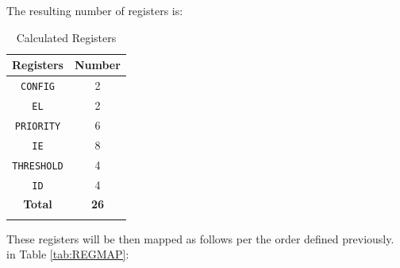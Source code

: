 The resulting number of registers is:

\begin{longtable}[c]{@{}cc@{}}	
		\toprule 
		\textbf{Registers} & \textbf{Number}\\
		\midrule 
		\endhead
		\texttt{CONFIG}    & 2\\
		\texttt{EL}        & 2\\
		\texttt{PRIORITY}  & 6\\
		\texttt{IE}        & 8\\
		\texttt{THRESHOLD} & 4\\
		\texttt{ID}        & 4\\
		\midrule
		\textbf{Total}     & \textbf{26}\\
		\bottomrule 	
	\caption{Calculated Registers}
	\label{tab:REGMAPNUM}
\end{longtable}

These registers will be then mapped as follows per the order defined 
\ifdefined\MARKDOWN
previously.
\else
in Table \ref{tab:REGMAP}:
\fi

